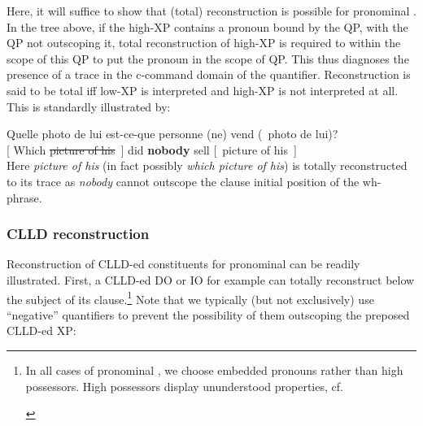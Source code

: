 \documentclass[output=paper]{langsci/langscibook}
\begin{document}
\ea
\z
%
Here, it will suffice to show that (total) reconstruction is possible for
pronominal . In the tree above, if the high-XP contains a pronoun bound
by the QP, with the QP not outscoping it, total reconstruction of high-XP is
required to within the scope of this QP to put the pronoun in the scope of QP.
This thus diagnoses the presence of a trace in the c-command domain of the
quantifier. Reconstruction is said to be total iff low-XP is interpreted and
high-XP is not interpreted at all.  This is standardly illustrated by:

\ea
    \gll \hphantom{[ }Quelle {photo de lui} est-ce-que personne (ne) vend (~photo de lui)?\\
    {[ Which} \sout{picture of his}~] did {\bf
        nobody} \hphantom{(}\Neg{} sell [~picture of his~]\\
\z
%
Here {\it picture of his} (in fact possibly {\it which picture of his}) is
totally reconstructed to its trace as {\it nobody} cannot outscope the clause
initial position of the wh-phrase.

\subsubsection{CLLD reconstruction}

Reconstruction of \gls{CLLD}-ed constituents for pronominal  can be
readily illustrated. First, a \gls{CLLD}-ed DO or IO for example can totally
reconstruct below the subject of its clause.\footnote{In all cases of
    pronominal , we choose embedded pronouns rather than high
    possessors. High possessors display ununderstood properties, cf.\

\begin{exe}
    \begin{xlist}
    \end{xlist}
\end{exe}}
%
Note that we typically (but not exclusively) use \enquote{negative} quantifiers
to prevent the possibility of them outscoping the preposed \gls{CLLD}-ed XP:
\end{document}
